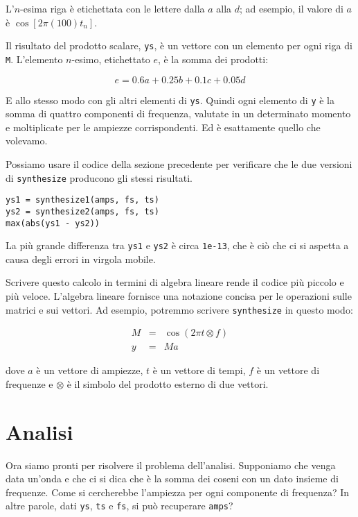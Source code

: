 \documentclass[12pt,a4paper]{book}
\begin{document}
L'$n$-esima riga è etichettata con le lettere dalla $a$ alla $d$; ad esempio, il valore di $a$ è $\cos [2 \pi (100) t_n]$.

Il risultato del prodotto scalare, {\tt ys}, è un vettore con un elemento per ogni riga di {\tt M}. L'elemento $n$-esimo, etichettato $e$, è la somma dei prodotti:

%
\[ e = 0.6 a + 0.25 b + 0.1 c + 0.05 d \] 

%
E allo stesso modo con gli altri elementi di {\tt ys}. Quindi ogni elemento di {\tt y} è la somma di quattro componenti di frequenza, valutate in un determinato momento e moltiplicate per le ampiezze corrispondenti. Ed è esattamente quello che volevamo.

Possiamo usare il codice della sezione precedente per verificare che le due versioni di {\tt synthesize} producono gli stessi risultati.

\begin{verbatim} 
ys1 = synthesize1(amps, fs, ts)
ys2 = synthesize2(amps, fs, ts)
max(abs(ys1 - ys2))
 \end{verbatim} 

La più grande differenza tra {\tt ys1} e {\tt ys2} è circa {\tt 1e-13}, che è ciò che ci si aspetta a causa degli errori in virgola mobile.

Scrivere questo calcolo in termini di algebra lineare rende il codice più piccolo e più veloce. L'algebra lineare fornisce una notazione concisa per le operazioni sulle matrici e sui vettori. Ad esempio, potremmo scrivere {\tt synthesize} in questo modo:

%
\begin{eqnarray*} M&=& \cos (2 \pi t \otimes f) \\ y&=&M a \end{eqnarray*} 

%
dove $a$ è un vettore di ampiezze, $t$ è un vettore di tempi, $f$ è un vettore di frequenze e $\otimes$ è il simbolo del prodotto esterno di due vettori.

\section{Analisi} \label{analysis} 

Ora siamo pronti per risolvere il problema dell'analisi. Supponiamo che venga data un'onda e che ci si dica che è la somma dei coseni con un dato insieme di frequenze. Come si cercherebbe l'ampiezza per ogni componente di frequenza? In altre parole, dati {\tt ys}, {\tt ts} e {\tt fs}, si può recuperare {\tt amps}?
\end{document}
